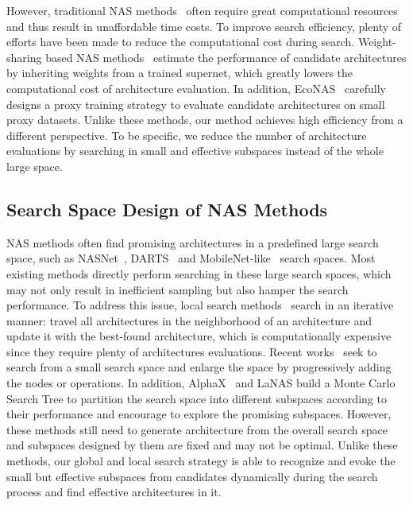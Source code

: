 \documentclass[lettersize,journal]{IEEEtran}
\begin{document}
However, traditional NAS methods~\cite{baker2016designing,real2019regularized} often require great computational resources and thus result in unaffordable time costs.
To improve search efficiency, plenty of efforts have been made to reduce the computational cost during search.
Weight-sharing based NAS methods~\cite{pham2018efficient,Cai2020Once,chen2021contrastive} estimate the performance of candidate architectures by inheriting weights from a trained supernet, which greatly lowers the computational cost of architecture evaluation.
In addition, EcoNAS~\cite{zhou2020econas} carefully designs a proxy training strategy to evaluate candidate architectures on small proxy datasets.
Unlike these methods, our method achieves high efficiency from a different perspective.
To be specific, we reduce the number of architecture evaluations by searching in small and effective subspaces instead of the whole large space.

\subsection{Search Space Design of NAS Methods}

NAS methods often find promising architectures in a predefined large search space, such as NASNet~\cite{zoph2018learning}, DARTS~\cite{liu2018darts} and MobileNet-like~\cite{tan2019mnasnet} search spaces.
Most existing methods directly perform searching in these large search spaces, which may not only result in inefficient sampling but also hamper the search performance.
To address this issue, local search methods~\cite{white2020exploring} search in an iterative manner: travel all architectures in the neighborhood of an architecture and update it with the best-found architecture, which is computationally expensive since they require plenty of architectures evaluations.
Recent works~\cite{liu2018progressive, guo2020breaking,li2020improving} seek to search from a small search space and enlarge the space by progressively adding the nodes or operations.
In addition, AlphaX~\cite{wang2019alphax} and LaNAS\cite{wang2022sample} build a Monte Carlo Search Tree to partition the search space into different subspaces according to their performance and encourage to explore the promising subspaces.
However, these methods still need to generate architecture from the overall search space and subspaces designed by them are fixed and may not be optimal.
Unlike these methods, our global and local search strategy is able to recognize and evoke the small but effective subspaces from candidates dynamically during the search process and find effective architectures in it.
\end{document}
